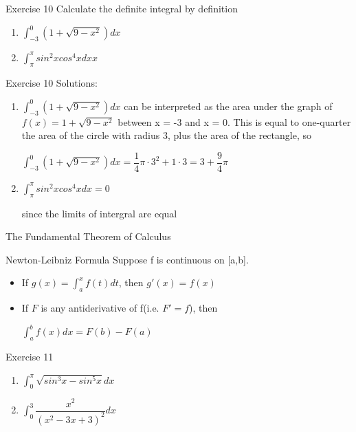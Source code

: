 \begin{frame}{Exercise 10}
    Calculate the definite integral by definition
    \begin{enumerate}
        \item $\int_{-3}^{0} (1+\sqrt{9-x^2})dx$
        \item $\int_\pi^\pi sin^2 xcos^4 xdxx$
    \end{enumerate}

\end{frame}

\begin{frame}{Exercise 10}
    Solutions:
    \begin{enumerate}
        \item
              $\int_{-3}^{0} (1+\sqrt{9-x^2})dx$ can be interpreted as the area under the graph of $f(x) = 1+\sqrt{9-x^2}$ between x = -3 and x = 0. This is equal to one-quarter the area of the circle with radius 3, plus the area of the rectangle, so

              $\int_{-3}^{0} (1+\sqrt{9-x^2})dx = \dfrac{1}{4}\pi\cdot3^2 + 1\cdot 3 = 3 + \dfrac{9}{4}\pi$
        \item $\int_\pi^\pi sin^2 xcos^4 xdx = 0$

              since the limits of intergral are equal
    \end{enumerate}
\end{frame}

\begin{frame}{The Fundamental Theorem of Calculus}
    \begin{block}{Newton-Leibniz Formula}
        Suppose f is continuous on [a,b].
        \begin{itemize}
            \item If $g(x) = \int_a^x f(t)dt$, then $g'(x) = f(x)$
            \item If $F$ is any antiderivative of f(i.e. $F' = f$), then

                  $\int_a^b f(x)dx = F(b) - F(a)$
        \end{itemize}
    \end{block}
\end{frame}

\begin{frame}{Exercise 11}
    \begin{enumerate}
        \item $\int_{0}^{\pi}\sqrt{sin^3x - sin^5x}dx$
        \item  $\int_{0}^{3}\dfrac{x^2}{(x^2 -3x +3)^2}dx$
    \end{enumerate}
\end{frame}


